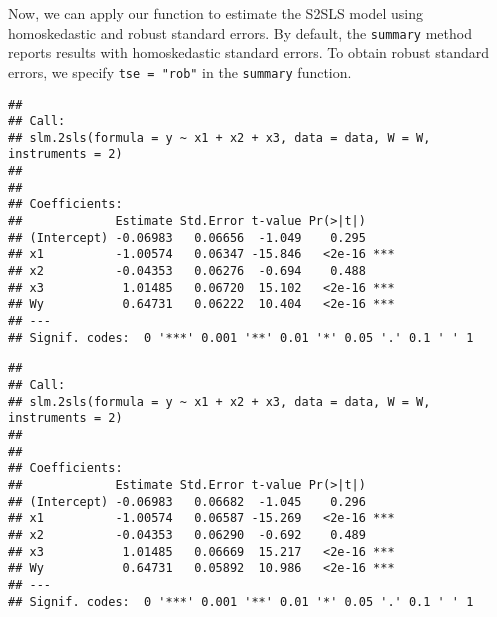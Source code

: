 \begin{knitrout}
\begin{kframe}
\begin{alltt}
  \hlstd{(}\hlstd{)}
  \hlopt{$}    \hlstd{=} \hlstd{,}  \hlstd{=} \hlstd{)}
  \hlstd{(}\hlstd{)}
\hlstd{\}}
\end{alltt}
\end{kframe}
\end{knitrout}

Now, we can apply our function to estimate the S2SLS model using homoskedastic and robust standard errors. By default, the \texttt{summary} method reports results with homoskedastic standard errors. To obtain robust standard errors, we specify \texttt{tse = "rob"} in the \texttt{summary} function.

\begin{knitrout}
\color{fgcolor}\begin{kframe}
\begin{alltt}
 \hlkwb{<-}  \hlopt{~}  \hlopt{+}  \hlopt{+}       \hlstd{=} \hlstd{)}
\end{alltt}
\begin{verbatim}
## 
## Call:
## slm.2sls(formula = y ~ x1 + x2 + x3, data = data, W = W, instruments = 2)
## 
## 
## Coefficients:
##             Estimate Std.Error t-value Pr(>|t|)    
## (Intercept) -0.06983   0.06656  -1.049    0.295    
## x1          -1.00574   0.06347 -15.846   <2e-16 ***
## x2          -0.04353   0.06276  -0.694    0.488    
## x3           1.01485   0.06720  15.102   <2e-16 ***
## Wy           0.64731   0.06222  10.404   <2e-16 ***
## ---
## Signif. codes:  0 '***' 0.001 '**' 0.01 '*' 0.05 '.' 0.1 ' ' 1
\end{verbatim}
\begin{alltt}
  \hlstd{=} \hlstd{)}
\end{alltt}
\begin{verbatim}
## 
## Call:
## slm.2sls(formula = y ~ x1 + x2 + x3, data = data, W = W, instruments = 2)
## 
## 
## Coefficients:
##             Estimate Std.Error t-value Pr(>|t|)    
## (Intercept) -0.06983   0.06682  -1.045    0.296    
## x1          -1.00574   0.06587 -15.269   <2e-16 ***
## x2          -0.04353   0.06290  -0.692    0.489    
## x3           1.01485   0.06669  15.217   <2e-16 ***
## Wy           0.64731   0.05892  10.986   <2e-16 ***
## ---
## Signif. codes:  0 '***' 0.001 '**' 0.01 '*' 0.05 '.' 0.1 ' ' 1
\end{verbatim}
\end{kframe}
\end{knitrout}

